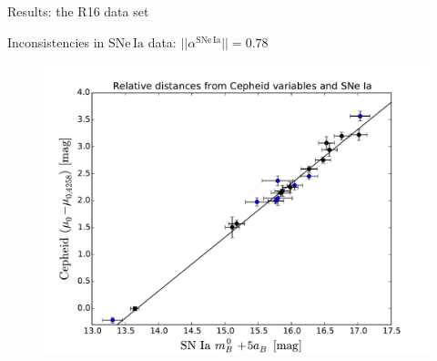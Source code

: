 \documentclass{beamer}
\newcommand{\SNe}{\mathrm{SNe\,Ia}}
\begin{document}
\begin{frame}{Results: the R16 data set}
\begin{center}
Inconsistencies in $\SNe$ data: $|| \alpha^{\SNe}|| = 0.78 $
\end{center}
\begin{figure}
\includegraphics[scale=0.45]{../figures/chapter-h0/effective_HP_SNIa_R16.pdf} 
\end{figure}
\end{frame}
\end{document}
